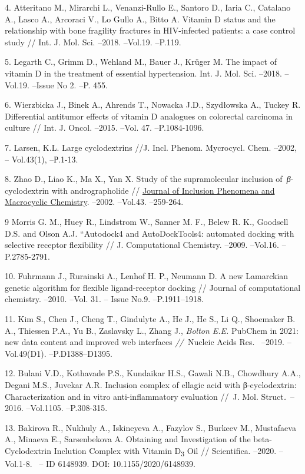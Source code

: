 4. Atteritano M., Mirarchi L., Venanzi-Rullo E., Santoro D., Iaria C.,
Catalano A., Lasco A., Arcoraci V., Lo Gullo A., Bitto A. Vitamin D
status and the relationship with bone fragility fractures in
HIV-infected patients: a case control study // Int. J. Mol. Sci. --2018.
--Vol.19. --P.119.

5. Legarth C., Grimm D., Wehland M., Bauer J., Krüger M. The impact of
vitamin D in the treatment of essential hypertension. Int. J. Mol. Sci.
--2018. --Vol.19. --Issue No 2. --P. 455.

6. Wierzbicka J., Binek A., Ahrends T., Nowacka J.D., Szydłowska A.,
Tuckey R. Differential antitumor effects of vitamin D analogues on
colorectal carcinoma in culture // Int. J. Oncol. --2015. --Vol. 47.
--P.1084-1096.

7. Larsen, K.L. Large cyclodextrins //J. Incl. Phenom. Mycrocycl. Chem.
--2002, -- Vol.43(1), --Р.1-13.

8. Zhao D., Liao K., Ma X., Yan X. Study of the supramolecular inclusion
of~\emph{β}-cyclodextrin with andrographolide //
\href{https://link.springer.com/journal/10847}{Journal of Inclusion
Phenomena and Macrocyclic Chemistry}. --2002. --Vol.43. --259-264.

9 Morris G. M., Huey R., Lindstrom W., Sanner M. F., Belew R. K.,
Goodsell D.S. and Olson A.J. ``Autodock4 and AutoDockTools4: automated
docking with selective receptor flexibility // J. Computational
Chemistry. --2009. --Vol.16. --P.2785-2791.

10. Fuhrmann J., Rurainski A., Lenhof H. P., Neumann D. A new Lamarckian
genetic algorithm for flexible ligand-receptor docking // Journal of
computational chemistry. --2010. --Vol. 31. -- Issue No.9.
--P.1911--1918.

11. Kim S., Chen J., Cheng T., Gindulyte A., He J., He S., Li Q.,
Shoemaker B. A., Thiessen P.A., Yu B., Zaslavsky L., Zhang J.,
\emph{Bolton E.E.} PubChem in 2021: new data content and improved web
interfaces \emph{//~}Nucleic Acids Res.~ --2019. --Vol.49(D1).
--P.D1388--D1395.

12. Bulani V.D., Kothavade P.S., Kundaikar H.S., Gawali N.B., Chowdhury
A.A., Degani M.S., Juvekar A.R. Inclusion complex of ellagic acid with
β-cyclodextrin: Characterization and in vitro anti-inflammatory
evaluation //~J. Mol. Struct\emph{.}~--2016. --Vol.1105. --P.308-315.

13. Bakirova R., Nukhuly A., Iskineyeva A., Fazylov S., Burkeev M.,
Mustafaeva A., Minaeva E., Sarsenbekova A. Obtaining and Investigation
of the beta-Cyclodextrin Inclution Complex with Vitamin
D\textsubscript{3} Oil // Scientifica. --2020. --Vol.1-8. ~-- ID
6148939. DOI: 10.1155/2020/6148939.

